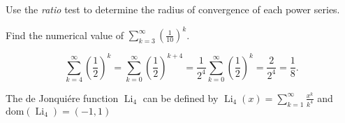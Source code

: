 \documentclass[fleqn,12pt]{exam}
\begin{document}
\begin{questions}
\begin{parts}
\begin{solution}%

\end{solution}
\end{parts}
\newpage

\question Use the \emph{ratio} test to determine the radius of convergence of each power series.







\question [1] Find the numerical value of  \(\displaystyle \sum_{k=3}^\infty \left(\frac{1}{10} \right)^k \).
\begin{solution}%
\[
 \sum_{k=4}^\infty \left(\frac{1}{2} \right)^k = \sum_{k=0}^\infty \left(\frac{1}{2} \right)^{k + 4}
  = \frac{1}{2^4} \sum_{k=0}^\infty \left(\frac{1}{2} \right)^{k} = \frac{2}{2^4} = \frac{1}{8}.
\]
\end{solution}
\newpage


\question The de Jonqui\'ere function \(\operatorname{Li}_4\) can be defined by 
\(\displaystyle
  \operatorname{Li}_4(x) = \sum_{k=1}^\infty \frac{x^k}{k^4}
\) and $\mathrm{dom}(\operatorname{Li}_4) = (-1,1)$

\end{questions}
\end{document}
